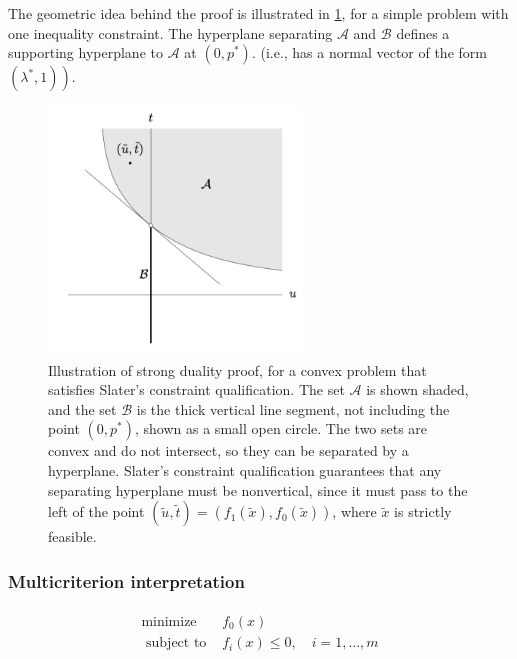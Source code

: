 \documentclass{article}
\begin{document}

The geometric idea behind the proof is illustrated in \cref{fig:fatrgd}, for a simple problem with one inequality constraint. The hyperplane separating $\mathcal{A}$ and $\mathcal{B}$ defines a supporting hyperplane to $\mathcal{A}$ at $\left(0, p^* \right) .$  (i.e., has a normal vector of the form $\left.\left(\lambda^* , 1\right)\right)$.%
\begin{figure}
    \centering
    \includegraphics[width=0.6\textwidth]{Figs/12.png}
    \caption{ Illustration of strong duality proof, for a convex problem that satisfies Slater's constraint qualification. The set $\mathcal{A}$ is shown shaded, and the set $\mathcal{B}$ is the thick vertical line segment, not including the point $\left(0, p^* \right)$, shown as a small open circle. The two sets are convex and do not intersect, so they can be separated by a hyperplane. Slater's constraint qualification guarantees that any separating hyperplane must be nonvertical, since it must pass to the left of the point $(\tilde{u}, \tilde{t})=\left(f_{1}(\tilde{x}), f_{0}(\tilde{x})\right)$, where $\tilde{x}$ is strictly feasible.}
    \label{fig:fatrgd}
\end{figure}
\subsubsection{Multicriterion interpretation}
\begin{align}
\begin{array}{ll}
\operatorname{minimize} & f_{0}(x) \\
\text { subject to } & f_{i}(x) \leq 0, \quad i=1, \ldots, m
\end{array}\label{eq:truio}
\end{align}
\end{document}
